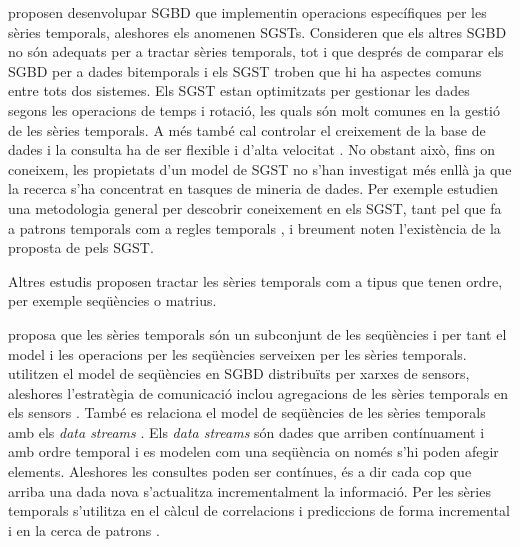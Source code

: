\textcite{dreyer94} proposen desenvolupar \gls{SGBD} que implementin
operacions específiques per les sèries temporals, aleshores els
anomenen \glspl{SGST}. Consideren que els altres \gls{SGBD} no són
adequats per a tractar sèries temporals, tot i que després de comparar
els \gls{SGBD} per a dades bitemporals i els
\gls{SGST} \parencite{schmidt95} troben que hi ha aspectes comuns
entre tots dos sistemes.  Els \gls{SGST} estan optimitzats per
gestionar les dades segons les operacions de temps i rotació, les
quals són molt comunes en la gestió de les sèries temporals.  A més
també cal controlar el creixement de la base de dades i la consulta ha
de ser flexible i d'alta velocitat \parencite{keogh10:isax}.  No
obstant això, fins on coneixem, les propietats d'un model de
\gls{SGST} no s'han investigat més enllà ja que la recerca s'ha
concentrat en tasques de mineria de dades. Per exemple
\textcite{last01} estudien una metodologia general per descobrir
coneixement en els \gls{SGST}, tant pel que fa a patrons
temporals %
com a regles temporals%
, i breument noten l'existència de la proposta  de \textcite{dreyer94} pels
\gls{SGST}.



Altres estudis proposen tractar les sèries temporals com a tipus que
tenen ordre, per exemple seqüències o matrius.

\textcite{seshadri96:thesis} proposa que les sèries temporals són un
subconjunt de les seqüències i per tant el model i les operacions per
les seqüències \parencite{seshadri95} serveixen per les sèries
temporals.  \textcite{bonnet01} utilitzen el model de seqüències en
\gls{SGBD} distribuïts per xarxes de sensors, aleshores l'estratègia
de comunicació inclou agregacions de les sèries temporals en els
sensors \parencite{demers03}.  També es relaciona el model de
seqüències de les sèries temporals amb els \emph{data
  streams} \parencite{babcock02,jagadish95,ogras06}. Els \emph{data
  streams} són dades que arriben contínuament i amb ordre temporal i
es modelen com una seqüència on només s'hi poden afegir
elements. Aleshores les consultes poden ser contínues, és a dir cada
cop que arriba una dada nova s'actualitza incrementalment la
informació. Per les sèries temporals s'utilitza en el càlcul de
correlacions i prediccions de forma incremental \parencite{yi00} i en
la cerca de patrons \parencite{bai05}.

